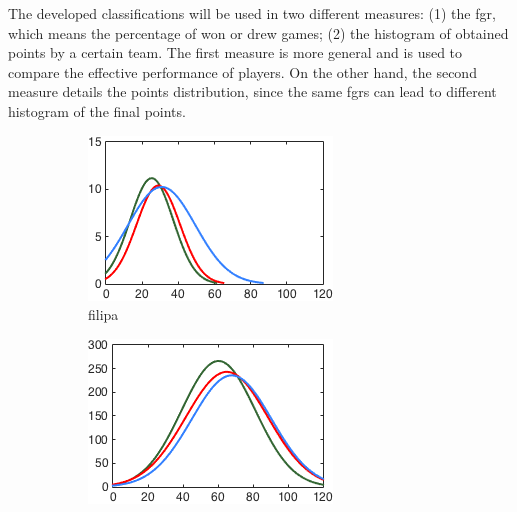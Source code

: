 The developed classifications will be used in two different measures: (1) the \ac{fgr}, which means the percentage of won or drew games; (2) the histogram of obtained points by a certain team.
The first measure is more general and is used to compare the effective performance of players.
On the other hand, the second measure details the points distribution, since the same \acp{fgr} can lead to different histogram of the final points.

\begin{figure}[h]
        \centering
        \begin{subfigure}[h]{0.32\textwidth}
                \includegraphics[width=\textwidth]{./img/4/ABChard}
                \caption{filipa}
                \label{fig:ABC-Hhard}
        \end{subfigure}
        \begin{subfigure}[h]{0.32\textwidth}
                \includegraphics[width=\textwidth]{./img/4/ABCmedium}

\end{subfigure}
\end{figure}
